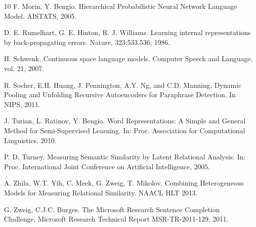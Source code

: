 \documentclass{article} %
\begin{document}
\begin{thebibliography}{10}
 F. Morin, Y. Bengio. Hierarchical Probabilistic Neural Network Language Model. AISTATS, 2005.

 D. E. Rumelhart, G. E. Hinton, R. J. Williams. Learning internal representations
by back-propagating errors. Nature, 323:533.536, 1986.

 H. Schwenk. Continuous space language models. Computer Speech and Language, vol. 21, 2007.

 R. Socher, E.H. Huang, J. Pennington, A.Y. Ng, and C.D. Manning. Dynamic Pooling and Unfolding Recursive Autoencoders for Paraphrase Detection. In NIPS, 2011.

 J. Turian, L. Ratinov, Y. Bengio.
Word Representations: A Simple and General Method for Semi-Supervised Learning.
In: Proc. Association for Computational Linguistics, 2010.

 P. D. Turney. Measuring Semantic Similarity by Latent Relational Analysis. In: Proc. International Joint Conference on Artificial Intelligence, 2005.

 A. Zhila, W.T. Yih, C. Meek, G. Zweig, T. Mikolov. Combining Heterogeneous Models for Measuring Relational Similarity.
NAACL HLT 2013.

 G. Zweig, C.J.C. Burges. The Microsoft Research Sentence Completion Challenge, Microsoft Research Technical Report MSR-TR-2011-129, 2011.

\end{thebibliography}
\end{document}
